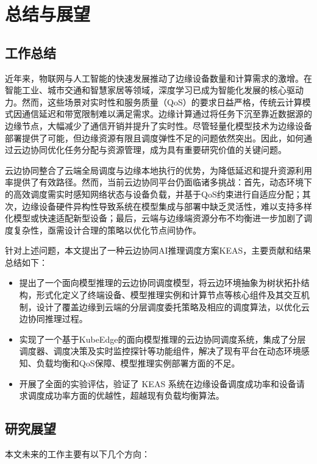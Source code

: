 \chapter{总结与展望}

\section{工作总结}

近年来，物联网与人工智能的快速发展推动了边缘设备数量和计算需求的激增。在智能工业、城市交通和智慧家居等领域，深度学习已成为智能化发展的核心驱动力。然而，这些场景对实时性和服务质量（QoS）的要求日益严格，传统云计算模式因通信延迟和带宽限制难以满足需求。边缘计算通过将任务下沉至靠近数据源的边缘节点，大幅减少了通信开销并提升了实时性。尽管轻量化模型技术为边缘设备部署提供了可能，但边缘资源有限且调度弹性不足的问题依然突出。因此，如何通过云边协同优化任务分配与资源管理，成为具有重要研究价值的关键问题。

云边协同整合了云端全局调度与边缘本地执行的优势，为降低延迟和提升资源利用率提供了有效路径。然而，当前云边协同平台仍面临诸多挑战：首先，动态环境下的高效调度需实时感知网络状态与设备负载，并基于QoS约束进行自适应分配；其次，边缘设备硬件异构性导致系统在模型集成与部署中缺乏灵活性，难以支持多样化模型或快速适配新型设备；最后，云端与边缘端资源分布不均衡进一步加剧了调度复杂性，亟需设计合理的策略以优化节点间协作。

针对上述问题，本文提出了一种云边协同AI推理调度方案KEAS，主要贡献和结果总结如下：

\begin{itemize} 
    \item 提出了一个面向模型推理的云边协同调度模型，将云边环境抽象为树状拓扑结构，形式化定义了终端设备、模型推理实例和计算节点等核心组件及其交互机制，设计了覆盖边缘到云端的分层调度委托策略及相应的调度算法，以优化云边协同推理过程。
    \item 实现了一个基于KubeEdge的面向模型推理的云边协同调度系统，集成了分层调度器、调度决策及实时监控探针等功能组件，解决了现有平台在动态环境感知、负载均衡和QoS保障、模型推理实例部署方面的不足。
    \item 开展了全面的实验评估，验证了 KEAS 系统在边缘设备调度成功率和设备请求调度成功率方面的优越性，超越现有负载均衡算法。
\end{itemize}

\section{研究展望}

本文未来的工作主要有以下几个方向：

